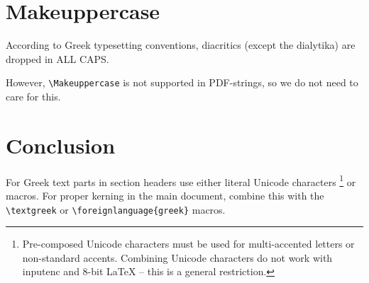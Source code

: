 \documentclass{article}
\begin{document}
\subsection{\ensuregreek{
  \accvaria\textomega\ypogegrammeni
  \textomega\ypogegrammeni
  \accoxia\textomega\ypogegrammeni
  \~\textomega
  \~\textomega\ypogegrammeni
  \accvaria\textOmicron
  \accoxia\textOmicron
  \accvaria\textOmega
  \accoxia\textOmega
  \textOmega\ypogegrammeni
  \accoxia{ }
  \accdasia{ }
}}

\section{Makeuppercase}

According to Greek typesetting conventions,
diacritics (except the dialytika) are dropped in ALL CAPS.

However, \verb|\Makeuppercase| is not supported in PDF-strings, so we
do not need to care for this.

\section{Conclusion}

For Greek text parts in section headers use either literal Unicode
characters%
\footnote{Pre-composed Unicode characters must be used for multi-accented
letters or non-standard accents. Combining Unicode characters do not work
with inputenc and 8-bit LaTeX – this is a general restriction.} or macros.
For proper kerning in the main document, combine this with the
\verb+\textgreek+ or \verb+\foreignlanguage{greek}+ macros.
\end{document}
